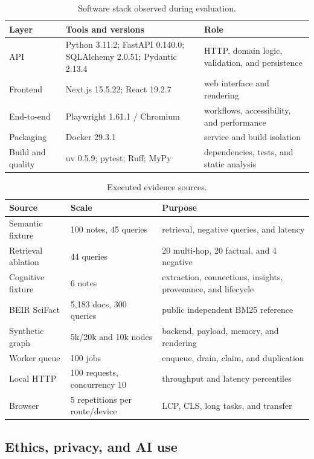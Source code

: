 \documentclass{sbc2023}
\begin{document}
\begin{table}[!t]
\caption{Software stack observed during evaluation.}
\label{tab:stack}
\small
\begin{tabularx}{\textwidth}{p{2.8cm}p{3.4cm}Y}
\toprule
Layer & Tools and versions & Role \\
\midrule
API & Python 3.11.2; FastAPI 0.140.0; SQLAlchemy 2.0.51; Pydantic 2.13.4 & HTTP, domain logic, validation, and persistence \\
Frontend & Next.js 15.5.22; React 19.2.7 & web interface and rendering \\
End-to-end & Playwright 1.61.1 / Chromium & workflows, accessibility, and performance \\
Packaging & Docker 29.3.1 & service and build isolation \\
Build and quality & uv 0.5.9; pytest; Ruff; MyPy & dependencies, tests, and static analysis \\
\bottomrule
\end{tabularx}
\end{table}

\begin{table}[!t]
\caption{Executed evidence sources.}
\label{tab:evidence}
\small
\begin{tabularx}{\textwidth}{p{3.2cm}p{2.1cm}Y}
\toprule
Source & Scale & Purpose \\
\midrule
Semantic fixture & 100 notes, 45 queries & retrieval, negative queries, and latency \\
Retrieval ablation & 44 queries & 20 multi-hop, 20 factual, and 4 negative \\
Cognitive fixture & 6 notes & extraction, connections, insights, provenance, and lifecycle \\
BEIR SciFact & 5,183 docs, 300 queries & public independent BM25 reference \\
Synthetic graph & 5k/20k and 10k nodes & backend, payload, memory, and rendering \\
Worker queue & 100 jobs & enqueue, drain, claim, and duplication \\
Local HTTP & 100 requests, concurrency 10 & throughput and latency percentiles \\
Browser & 5 repetitions per route/device & LCP, CLS, long tasks, and transfer \\
\bottomrule
\end{tabularx}
\end{table}
\FloatBarrier

\subsection{Ethics, privacy, and AI use}
\end{document}
